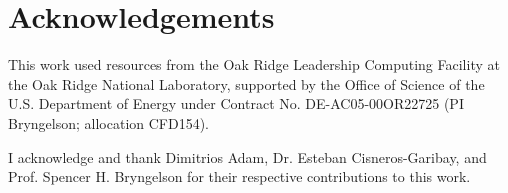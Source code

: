 \chapter*{Acknowledgements}

This work used resources from the Oak Ridge Leadership Computing Facility
at the Oak Ridge National Laboratory, supported by the Office of Science of the U.S.
Department of Energy under Contract No. DE-AC05-00OR22725 (PI Bryngelson; allocation CFD154).

I acknowledge and thank Dimitrios Adam, Dr. Esteban Cisneros-Garibay,
and Prof. Spencer H. Bryngelson for their respective contributions to this work.
